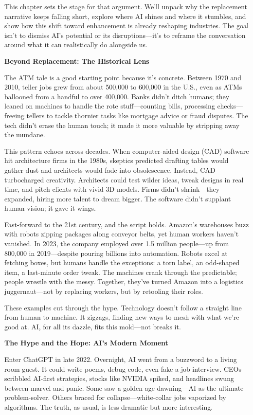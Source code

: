 \documentclass[
  Letterpaper,
]{scrbook}
\begin{document}
This chapter sets the stage for that argument. We'll unpack why the
replacement narrative keeps falling short, explore where AI shines and
where it stumbles, and show how this shift toward enhancement is already
reshaping industries. The goal isn't to dismiss AI's potential or its
disruptions---it's to reframe the conversation around what it can
realistically do alongside us.

\textbf{Beyond Replacement: The Historical Lens}

The ATM tale is a good starting point because it's concrete. Between
1970 and 2010, teller jobs grew from about 500,000 to 600,000 in the
U.S., even as ATMs ballooned from a handful to over 400,000. Banks
didn't ditch humans; they leaned on machines to handle the rote
stuff---counting bills, processing checks---freeing tellers to tackle
thornier tasks like mortgage advice or fraud disputes. The tech didn't
erase the human touch; it made it more valuable by stripping away the
mundane.

This pattern echoes across decades. When computer-aided design (CAD)
software hit architecture firms in the 1980s, skeptics predicted
drafting tables would gather dust and architects would fade into
obsolescence. Instead, CAD turbocharged creativity. Architects could
test wilder ideas, tweak designs in real time, and pitch clients with
vivid 3D models. Firms didn't shrink---they expanded, hiring more talent
to dream bigger. The software didn't supplant human vision; it gave it
wings.

Fast-forward to the 21st century, and the script holds. Amazon's
warehouses buzz with robots zipping packages along conveyor belts, yet
human workers haven't vanished. In 2023, the company employed over 1.5
million people---up from 800,000 in 2019---despite pouring billions into
automation. Robots excel at fetching boxes, but humans handle the
exceptions: a torn label, an odd-shaped item, a last-minute order tweak.
The machines crank through the predictable; people wrestle with the
messy. Together, they've turned Amazon into a logistics juggernaut---not
by replacing workers, but by retooling their roles.

These examples cut through the hype. Technology doesn't follow a
straight line from human to machine. It zigzags, finding new ways to
mesh with what we're good at. AI, for all its dazzle, fits this
mold---not breaks it.

\textbf{The Hype and the Hope: AI's Modern Moment}

Enter ChatGPT in late 2022. Overnight, AI went from a buzzword to a
living room guest. It could write poems, debug code, even fake a job
interview. CEOs scribbled AI-first strategies, stocks like NVIDIA
spiked, and headlines swung between marvel and panic. Some saw a golden
age dawning---AI as the ultimate problem-solver. Others braced for
collapse---white-collar jobs vaporized by algorithms. The truth, as
usual, is less dramatic but more interesting.
\end{document}

